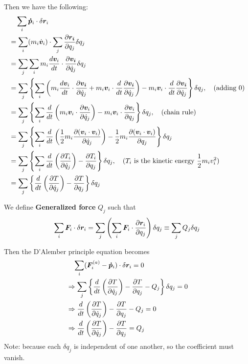 \documentclass[12pt]{article}
\begin{document}
Then we have the following:
$$
  \begin{aligned}
  	&\quad \sum_i \boldsymbol{\dot{p}}_i \cdot \delta \boldsymbol{r}_i  \\
  	&=  \sum_i (m_i \dot{\boldsymbol{v}}_i) \cdot  \sum_j \frac{\partial \boldsymbol{r_i}}{\partial q_j} \delta q_j  \\
  	&=  \sum_j \sum_i m_i \frac{d\boldsymbol{v}_i}{dt}  \cdot  \frac{\partial \boldsymbol{v_i}}{\partial \dot{q}_j} \delta q_j  \\
  	&=  \sum_j \left\{  \sum_i \left( m_i \frac{d \boldsymbol{v}_i}{dt}  \cdot  \frac{\partial \boldsymbol{v_i}}{\partial \dot{q}_j}  +    m_i \boldsymbol{v}_i  \cdot \frac{d}{dt} \frac{\partial \boldsymbol{v_i}}{\partial \dot{q}_j}\right) - m_i \boldsymbol{v}_i  \cdot \frac{d}{dt} \frac{\partial \boldsymbol{v_i}}{\partial \dot{q}_j} \right\} \delta q_j, 
  	\quad \textnormal{(adding 0)}\\
  	&= \sum_j \left\{     
  	\sum_i 
  	\frac{d}{dt}\left(m_i \boldsymbol{v}_i  \cdot   \frac{\partial \boldsymbol{v}_i}{\partial \dot{q}_j} \right) - m_i \boldsymbol{v}_i  \cdot   \frac{\partial \boldsymbol{v}_i}{\partial q_j}
  	 \right\}  \delta q_j,
  	  \quad \textnormal{(chain rule)}  \\
  	&= \sum_j \left\{     
  	\sum_i 
  	\frac{d}{dt}\left( \frac{1}{2} m_i  \frac{\partial (\boldsymbol{v}_i  \cdot \boldsymbol{v}_i)}{\partial \dot{q}_j} \right) - \frac{1}{2} m_i \frac{\partial (\boldsymbol{v}_i  \cdot \boldsymbol{v}_i)}{\partial q_j}
    \right\}\delta q_j  \\
  	&= \sum_j \left\{     
  	\sum_i
  	\frac{d}{dt}\left(  \frac{\partial T_i }{\partial \dot{q}_j} \right) -  \frac{\partial T_i}{\partial q_j}
  	 \right\} \delta q_j, 
  	 \quad \textnormal{($T_i$ is the kinetic energy $\frac{1}{2}m_iv_i^2$)} \\
  	&= \sum_j \left\{ 
  	\frac{d}{dt}\left(  \frac{\partial T}{\partial \dot{q}_j} \right) -  \frac{\partial T}{\partial q_j}
  	 \right\}  \delta q_j\\
  \end{aligned}
$$


We define \textbf{Generalized force} $Q_j$ such that 
$$ \sum_i \boldsymbol{F}_i \cdot \delta \boldsymbol{r}_i 
=  \sum_j   \left( \sum_i \boldsymbol{F}_i \cdot  \frac{\partial \boldsymbol{r}_i}{\partial q_j} \right) \delta q_j 
 \equiv \sum_j   Q_j \delta q_j $$

\begin{theorem}
\textnormal{Then the D'Alember principle equation becomes}
$$
  \begin{aligned}
  	&\quad \sum_i ( \boldsymbol{F}^{(a)}_i  - \boldsymbol{\dot{p}}_i) \cdot \delta \boldsymbol{r}_i = 0 \\
  	&\Rightarrow \sum_j \left\{ 
  	\frac{d}{dt}\left(  \frac{\partial T}{\partial \dot{q}_j} \right) -  \frac{\partial T}{\partial q_j} - Q_j
  	 \right\}\delta q_j = 0 \\
  	&\Rightarrow 	\frac{d}{dt}\left(  \frac{\partial T}{\partial \dot{q}_j} \right) -  \frac{\partial T}{\partial q_j} - Q_j = 0 \\
  	&\Rightarrow 	\frac{d}{dt}\left(  \frac{\partial T}{\partial \dot{q}_j} \right) -  \frac{\partial T}{\partial q_j} = Q_j 
  \end{aligned}
$$
Note: because each $\delta q_j$ is independent of one another, so the coefficient must vanish.
\end{theorem}
\end{document}
